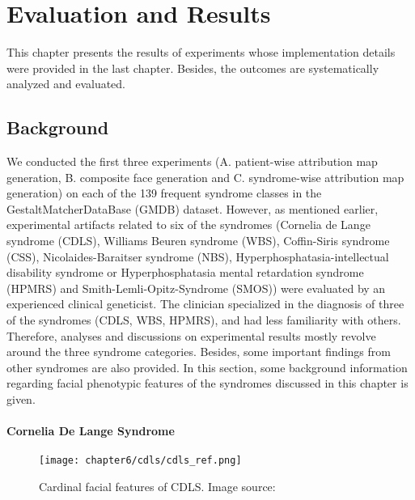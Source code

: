 \documentclass[../report.tex]{subfiles}
\begin{document}
    \chapter{Evaluation and Results}
	This chapter presents the results of experiments whose implementation details were provided in the last chapter. Besides, the outcomes are systematically analyzed and evaluated.
	
	
	\section{Background}
	We conducted the first three experiments (A. patient-wise attribution map generation, B. composite face generation and C. syndrome-wise attribution map generation) on each of the 139 frequent syndrome classes in the GestaltMatcherDataBase (GMDB) dataset. However, as mentioned earlier, experimental artifacts related to six of the syndromes (Cornelia de Lange syndrome (CDLS), Williams Beuren syndrome (WBS),  Coffin-Siris syndrome (CSS),  Nicolaides-Baraitser syndrome (NBS), Hyperphosphatasia-intellectual disability syndrome or Hyperphosphatasia mental retardation syndrome (HPMRS) and Smith-Lemli-Opitz-Syndrome (SMOS)) were evaluated by an experienced clinical geneticist. The clinician specialized in the diagnosis of three of the syndromes (CDLS, WBS, HPMRS), and had less familiarity with others. Therefore, analyses and discussions on experimental results mostly revolve around the three syndrome categories. Besides, some important findings from other syndromes are also provided. In this section, some background information regarding facial phenotypic features of the syndromes discussed in this chapter is given. 
	
	\subsubsection{Cornelia De Lange Syndrome}
		\begin{figure}[H]\label{fig_cdls_char}
		\centering
		\texttt{[image: chapter6/cdls/cdls\_ref.png]}	
		\caption[Cardinal features of CDLS]{Cardinal facial features of CDLS. Image source: \cite{kline2018diagnosis}}
	\end{figure}
	
\end{document}
